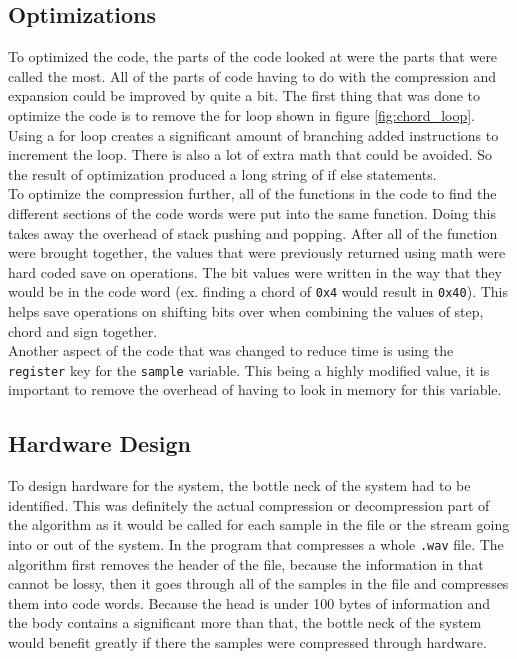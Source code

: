 \documentclass[12pt]{article}
\begin{document}
\subsection{Optimizations}

To optimized the code, the parts of the code looked at were the parts that were called the most. All of the parts of code having to do with the compression and expansion could be improved by quite a bit. The first thing that was done to optimize the code is to remove the for loop shown in figure \ref{fig:chord_loop}. Using a for loop creates a significant amount of branching added instructions to increment the loop. There is also a lot of extra math that could be avoided. So the result of optimization produced a long string of if else statements. \\

To optimize the compression further, all of the functions in the code to find the different sections of the code words were put into the same function. Doing this takes away the overhead of stack pushing and popping. After all of the function were brought together, the values that were previously returned using math were hard coded save on operations. The bit values were written in the way that they would be in the code word (ex. finding a chord of \texttt{0x4} would result in \texttt{0x40}). This helps save operations on shifting bits over when combining the values of step, chord and sign together. \\

Another aspect of the code that was changed to reduce time is using the \texttt{register} key for the  \texttt{sample} variable. This being a highly modified value, it is important to remove the overhead of having to look in memory for this variable.\\

\subsection{Hardware Design}

To design hardware for the system, the bottle neck of the system had to be identified. This was definitely the actual compression or decompression part of the algorithm as it would be called for each sample in the file or the stream going into or out of the system. In the program that compresses a whole \texttt{.wav} file. The algorithm first removes the header of the file, because the information in that cannot be lossy, then it goes through all of the samples in the file and compresses them into code words. Because the head is under 100 bytes of information and the body contains a significant more than that, the bottle neck of the system would benefit greatly if there the samples were compressed through hardware. \\
\end{document}
